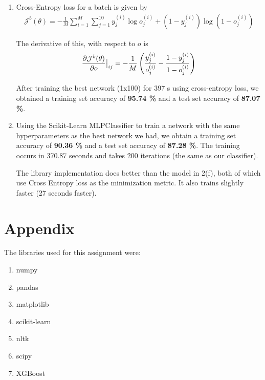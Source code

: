 \documentclass[12pt]{article}
\begin{document}
\begin{enumerate}[label=(\alph*)]
    
    \item Cross-Entropy loss for a batch is given by 
    \begin{align*}
        \mathcal{J}^b(\theta) = - \frac 1M \sum_{i=1}^M \sum_{j=1}^{10} 
        y^{(i)}_j\log o^{(i)}_j + (1-y^{(i)}_j)\log (1-o^{(i)}_j)
    \end{align*}

    The derivative of this, with respect to $o$ is 
    \begin{align*}
        \pdv{\mathcal{J}^b(\theta)}{o}\big|_{ij} = - \frac 1M \left( 
        \frac{y^{(i)}_j}{o^{(i)}_j} - \frac{1-y^{(i)}_j}{1-o^{(i)}_j} \right)
    \end{align*}

    After training the best network (1x100) for 397 s using cross-entropy loss, 
    we obtained a training set accuracy of \textbf{95.74 \%} and a test set 
    accuracy of \textbf{87.07 \%}. 

    \item Using the Scikit-Learn MLPClassifier to train a network with the 
    same hyperparameters as the best network we had, we obtain a training set accuracy 
    of \textbf{90.36 \%} and a test set accuracy of \textbf{87.28 \%}. The training
    occurs in 370.87 seconds and takes 200 iterations (the same as our classifier).

    The library implementation does better than the model in 2(f), both of which 
    use Cross Entropy loss as the minimization metric. It also trains slightly 
    faster (27 seconds faster).

\end{enumerate}

\section{Appendix}

The libraries used for this assignment were:
\begin{enumerate}
    \item numpy
    \item pandas
    \item matplotlib
    \item scikit-learn
    \item nltk
    \item scipy
    \item XGBoost
\end{enumerate}
\end{document}

